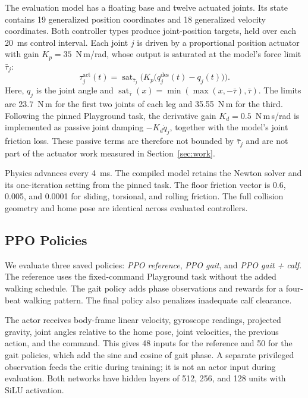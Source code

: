 \documentclass[conference]{IEEEtran}
\begin{document}
The evaluation model has a floating base and twelve actuated joints. Its state contains 19 generalized position coordinates and 18 generalized velocity coordinates. Both controller types produce joint-position targets, held over each 20~ms control interval. Each joint $j$ is driven by a proportional position actuator with gain $K_p=35$~N\,m/rad, whose output is saturated at the model's force limit $\bar\tau_j$:
\begin{equation}
\tau_j^{\mathrm{act}}(t)=\operatorname{sat}_{\bar\tau_j}\!\bigl(K_p\bigl(q_j^{\mathrm{des}}(t)-q_j(t)\bigr)\bigr).
\label{eq:actuator}
\end{equation}
Here, $q_j$ is the joint angle and $\operatorname{sat}_{\bar\tau}(x)=\min(\max(x,-\bar\tau),\bar\tau)$. The limits are 23.7~N\,m for the first two joints of each leg and 35.55~N\,m for the third. Following the pinned Playground task, the derivative gain $K_d=0.5$~N\,m\,s/rad is implemented as passive joint damping $-K_d\dot q_j$, together with the model's joint friction loss. These passive terms are therefore not bounded by $\bar\tau_j$ and are not part of the actuator work measured in Section~\ref{sec:work}.

Physics advances every 4~ms. The compiled model retains the Newton solver and its one-iteration setting from the pinned task. The floor friction vector is 0.6, 0.005, and 0.0001 for sliding, torsional, and rolling friction. The full collision geometry and home pose are identical across evaluated controllers.

\subsection{PPO Policies}

We evaluate three saved policies: \emph{PPO reference}, \emph{PPO gait}, and \emph{PPO gait + calf}. The reference uses the fixed-command Playground task without the added walking schedule. The gait policy adds phase observations and rewards for a four-beat walking pattern. The final policy also penalizes inadequate calf clearance.

The actor receives body-frame linear velocity, gyroscope readings, projected gravity, joint angles relative to the home pose, joint velocities, the previous action, and the command. This gives 48 inputs for the reference and 50 for the gait policies, which add the sine and cosine of gait phase. A separate privileged observation feeds the critic during training; it is not an actor input during evaluation. Both networks have hidden layers of 512, 256, and 128 units with SiLU activation.
\end{document}
